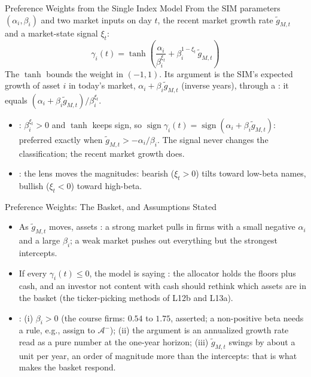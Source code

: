 \documentclass[aspectratio=169,11pt]{beamer}
\newcommand{\Am}{\mathcal{A}^{-}}
\begin{document}
\begin{frame}{Preference Weights from the Single Index Model}
  From the SIM parameters $(\alpha_i,\beta_i)$ and two market inputs on day $t$,
  the recent market growth rate $\tilde g_{M,t}$ and a market-state signal $\xi_t$:
  \[
    \boxed{\gamma_i(t)=\tanh\!\left(\frac{\alpha_i}{\beta_i^{\xi_t}}+\beta_i^{1-\xi_t}\,\tilde g_{M,t}\right)}
  \]
  The $\tanh$ bounds the weight in $(-1,1)$. Its argument is the SIM's expected
  growth of asset $i$ in today's market, $\alpha_i+\beta_i\tilde g_{M,t}$ (inverse
  years), through a : it equals $(\alpha_i+\beta_i\tilde g_{M,t})/\beta_i^{\xi_t}$.
  \begin{itemize}\setlength{\itemsep}{0.3em}
    \item {}: $\beta_i^{\xi_t}>0$ and
      $\tanh$ keeps sign, so $\operatorname{sign}\gamma_i(t)=\operatorname{sign}(\alpha_i+\beta_i\tilde g_{M,t})$:
      preferred exactly when $\tilde g_{M,t}>-\alpha_i/\beta_i$. The signal never
      changes the classification; the recent market growth does.
    \item {}: the lens moves the magnitudes: bearish
      ($\xi_t>0$) tilts toward low-beta names, bullish ($\xi_t<0$) toward high-beta.
  \end{itemize}
\end{frame}

\begin{frame}{Preference Weights: The Basket, and Assumptions Stated}
  \begin{itemize}\setlength{\itemsep}{0.45em}
    \item As $\tilde g_{M,t}$ moves, assets : a
      strong market pulls in firms with a small negative $\alpha_i$ and a large
      $\beta_i$; a weak market pushes out everything but the strongest intercepts.
    \item If every $\gamma_i(t)\le0$, the model is saying : the allocator holds the floors plus cash, and an
      investor not content with cash should rethink which assets are in the
      basket (the ticker-picking methods of L12b and L13a).
    \item {}: (i) $\beta_i>0$ (the course firms: $0.54$ to
      $1.75$, asserted; a non-positive beta needs a rule, e.g., assign to $\Am$);
      (ii) the argument is an annualized growth rate read as a pure number at the
      one-year horizon; (iii) $\tilde g_{M,t}$ swings by about a unit per year, an
      order of magnitude more than the intercepts: that is what makes the basket
      respond.
  \end{itemize}
\end{frame}
\end{document}
